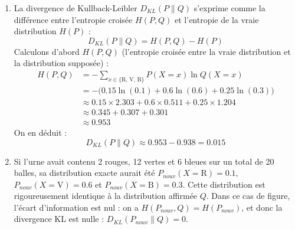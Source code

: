 \documentclass[solutions]{../exercices}
\begin{document}
\begin{solution}
\begin{enumerate}
\begin{align*}
        &\approx - \big(0.15 \times (-1.897) + 0.6 \times (-0.511) + 0.25 \times (-1.386)\big) \\
        &\approx 0.285 + 0.307 + 0.347 \\
        &\approx 0.938
    \end{align*}
    \item La divergence de Kullback-Leibler $D_{KL}(P \parallel Q)$ s'exprime comme la différence entre l'entropie croisée $H(P, Q)$ et l'entropie de la vraie distribution $H(P)$ :
    \begin{equation*}
        D_{KL}(P \parallel Q) = H(P, Q) - H(P)
    \end{equation*}
    Calculons d'abord $H(P, Q)$ (l'entropie croisée entre la vraie distribution et la distribution supposée) :
    \begin{align*}
        H(P, Q) &= - \sum_{x \in \{\text{R, V, B}\}} P(X=x) \ln Q(X=x) \\
        &= -\big(0.15 \ln(0.1) + 0.6 \ln(0.6) + 0.25 \ln(0.3)\big) \\
        &\approx 0.15 \times 2.303 + 0.6 \times 0.511 + 0.25 \times 1.204 \\
        &\approx 0.345 + 0.307 + 0.301 \\
        &\approx 0.953
    \end{align*}
    On en déduit :
    \begin{equation*}
        D_{KL}(P \parallel Q) \approx 0.953 - 0.938 = 0.015
    \end{equation*}
    \item Si l'urne avait contenu 2 rouges, 12 vertes et 6 bleues sur un total de 20 balles, sa distribution exacte aurait été $P_{nouv}(X=\text{R}) = 0.1$, $P_{nouv}(X=\text{V}) = 0.6$ et $P_{nouv}(X=\text{B}) = 0.3$. 
    Cette distribution est rigoureusement identique à la distribution affirmée $Q$. Dans ce cas de figure, l'écart d'information est nul : on a $H(P_{nouv}, Q) = H(P_{nouv})$, et donc la divergence KL est nulle : $D_{KL}(P_{nouv} \parallel Q) = 0$.
\end{enumerate}
\end{solution}
\end{document}
